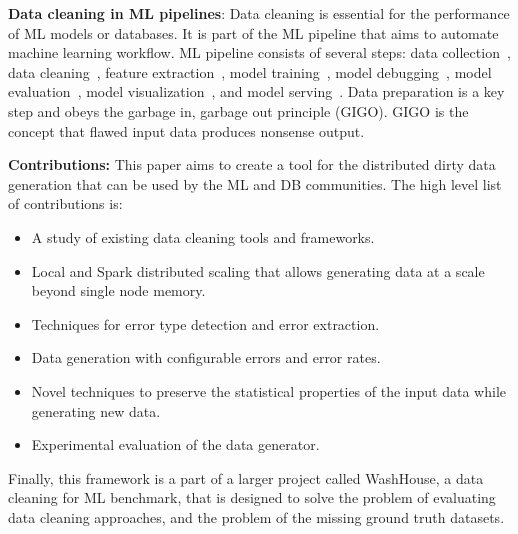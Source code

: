 
\textbf{Data cleaning in ML pipelines}: 
Data cleaning is essential for the performance of ML models or databases.
It is part of the ML pipeline that aims to automate machine learning workflow. 
ML pipeline consists of several steps: data collection~\cite{LiDLMS2015}, data cleaning~\cite{raha, baran, RekatsinasCIR2017, HeidariMIR2019, activeclean, alphaclean, cleanml}, feature extraction~\cite{ShahLKYK2021}, model training~\cite{RekatsinasCIR2017}, model debugging~\cite{SagadeevaB2021}, model evaluation~\cite{generalizing_confusion_matrix}, model visualization~\cite{NakandalaKP2019, CrottyGZBK2015, SimonyanVZ2013}, and model serving~\cite{OlstonFGHLLRR2017, Lee2018, WeiGZWCNOSR2018}.
Data preparation is a key step and obeys the garbage in, garbage out principle (GIGO).
GIGO is the concept that flawed input data produces nonsense output.

\textbf{Contributions:} 
This paper aims to create a tool for the distributed dirty data generation that can be used by the ML and DB communities. 
The high level list of contributions is:

\begin{itemize}
    \item A study of existing data cleaning tools and frameworks.
    \item Local and Spark distributed scaling that allows generating data at a scale beyond single node memory.
    \item Techniques for error type detection and error extraction.
    \item Data generation with configurable errors and error rates.
    \item Novel techniques to preserve the statistical properties of the input data while generating new data.
    \item Experimental evaluation of the data generator.
\end{itemize}

Finally, this framework is a part of a larger project called WashHouse, a data cleaning for ML benchmark, that is designed to solve the problem of evaluating data cleaning approaches, and the problem of the missing ground truth datasets.


